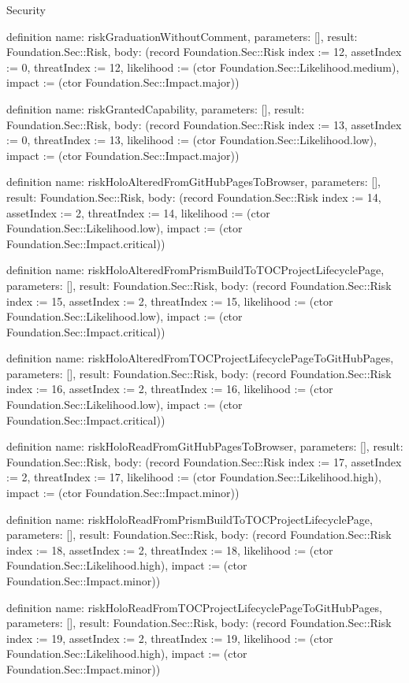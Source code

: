 \begin{lexlean}{Security}
\begin{semanticmodule}
definition{
  name: riskGraduationWithoutComment,
  parameters: [],
  result: Foundation.Sec::Risk,
  body: (record Foundation.Sec::Risk {index := 12, assetIndex := 0, threatIndex := 12, likelihood := (ctor Foundation.Sec::Likelihood.medium), impact := (ctor Foundation.Sec::Impact.major)})
}

definition{
  name: riskGrantedCapability,
  parameters: [],
  result: Foundation.Sec::Risk,
  body: (record Foundation.Sec::Risk {index := 13, assetIndex := 0, threatIndex := 13, likelihood := (ctor Foundation.Sec::Likelihood.low), impact := (ctor Foundation.Sec::Impact.major)})
}

definition{
  name: riskHoloAlteredFromGitHubPagesToBrowser,
  parameters: [],
  result: Foundation.Sec::Risk,
  body: (record Foundation.Sec::Risk {index := 14, assetIndex := 2, threatIndex := 14, likelihood := (ctor Foundation.Sec::Likelihood.low), impact := (ctor Foundation.Sec::Impact.critical)})
}

definition{
  name: riskHoloAlteredFromPrismBuildToTOCProjectLifecyclePage,
  parameters: [],
  result: Foundation.Sec::Risk,
  body: (record Foundation.Sec::Risk {index := 15, assetIndex := 2, threatIndex := 15, likelihood := (ctor Foundation.Sec::Likelihood.low), impact := (ctor Foundation.Sec::Impact.critical)})
}

definition{
  name: riskHoloAlteredFromTOCProjectLifecyclePageToGitHubPages,
  parameters: [],
  result: Foundation.Sec::Risk,
  body: (record Foundation.Sec::Risk {index := 16, assetIndex := 2, threatIndex := 16, likelihood := (ctor Foundation.Sec::Likelihood.low), impact := (ctor Foundation.Sec::Impact.critical)})
}

definition{
  name: riskHoloReadFromGitHubPagesToBrowser,
  parameters: [],
  result: Foundation.Sec::Risk,
  body: (record Foundation.Sec::Risk {index := 17, assetIndex := 2, threatIndex := 17, likelihood := (ctor Foundation.Sec::Likelihood.high), impact := (ctor Foundation.Sec::Impact.minor)})
}

definition{
  name: riskHoloReadFromPrismBuildToTOCProjectLifecyclePage,
  parameters: [],
  result: Foundation.Sec::Risk,
  body: (record Foundation.Sec::Risk {index := 18, assetIndex := 2, threatIndex := 18, likelihood := (ctor Foundation.Sec::Likelihood.high), impact := (ctor Foundation.Sec::Impact.minor)})
}

definition{
  name: riskHoloReadFromTOCProjectLifecyclePageToGitHubPages,
  parameters: [],
  result: Foundation.Sec::Risk,
  body: (record Foundation.Sec::Risk {index := 19, assetIndex := 2, threatIndex := 19, likelihood := (ctor Foundation.Sec::Likelihood.high), impact := (ctor Foundation.Sec::Impact.minor)})
}


\end{semanticmodule}
\end{lexlean}
